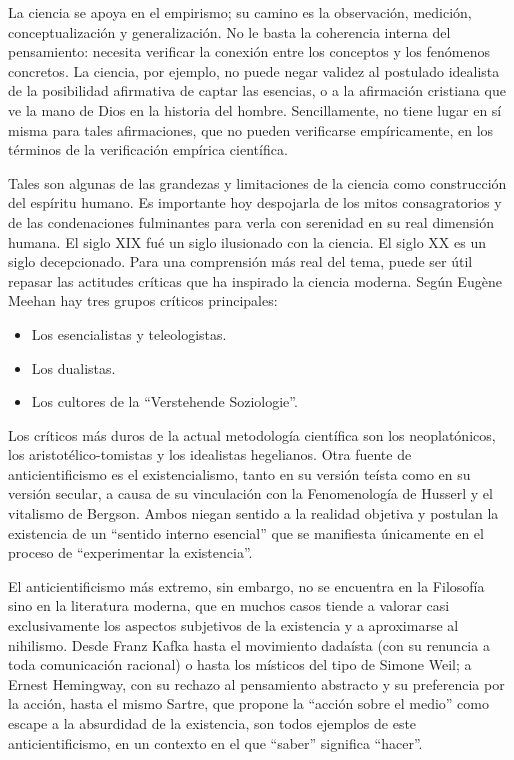 \documentclass[
]{book}
\providecommand{\tightlist}{%
  \setlength{\itemsep}{0pt}\setlength{\parskip}{0pt}}
\begin{document}
La ciencia se apoya en el empirismo; su camino es la observación, medición, conceptualización y generalización. No le basta la coherencia interna del pensamiento: necesita verificar la conexión entre los conceptos y los fenómenos concretos. La ciencia, por ejemplo, no puede negar validez al postulado idealista de la posibilidad afirmativa de captar las esencias, o a la afirmación cristiana que ve la mano de Dios en la historia del hombre. Sencillamente, no tiene lugar en sí misma para tales afirmaciones, que no pueden verificarse empíricamente, en los términos de la verificación empírica científica.

Tales son algunas de las grandezas y limitaciones de la ciencia como construcción del espíritu humano. Es importante hoy despojarla de los mitos consagratorios y de las condenaciones fulminantes para verla con serenidad en su real dimensión humana. El siglo XIX fué un siglo ilusionado con la ciencia. El siglo XX es un siglo decepcionado. Para una comprensión más real del tema, puede ser útil repasar las actitudes críticas que ha inspirado la ciencia moderna. Según Eugène Meehan hay tres grupos críticos principales:

\begin{itemize}
\tightlist
\item
  Los esencialistas y teleologistas.
\item
  Los dualistas.
\item
  Los cultores de la ``Verstehende Soziologie''.
\end{itemize}

Los críticos más duros de la actual metodología científica son los neoplatónicos, los aristotélico-tomistas y los idealistas hegelianos. Otra fuente de anticientificismo es el existencialismo, tanto en su versión teísta como en su versión secular, a causa de su vinculación con la Fenomenología de Husserl y el vitalismo de Bergson. Ambos niegan sentido a la realidad objetiva y postulan la existencia de un ``sentido interno esencial'' que se manifiesta únicamente en el proceso de ``experimentar la existencia''.

El anticientificismo más extremo, sin embargo, no se encuentra en la Filosofía sino en la literatura moderna, que en muchos casos tiende a valorar casi exclusivamente los aspectos subjetivos de la existencia y a aproximarse al nihilismo. Desde Franz Kafka hasta el movimiento dadaísta (con su renuncia a toda comunicación racional) o hasta los místicos del tipo de Simone Weil; a Ernest Hemingway, con su rechazo al pensamiento abstracto y su preferencia por la acción, hasta el mismo Sartre, que propone la ``acción sobre el medio'' como escape a la absurdidad de la existencia, son todos ejemplos de este anticientificismo, en un contexto en el que ``saber'' significa ``hacer''.
\end{document}
